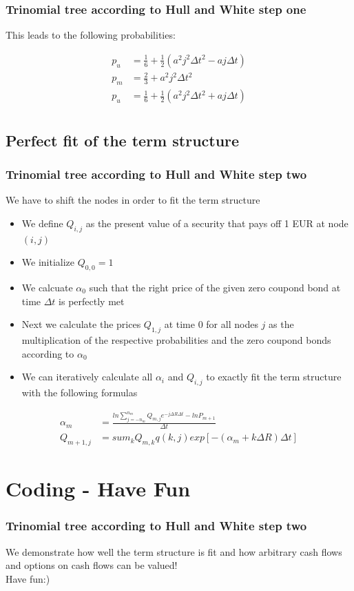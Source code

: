 \documentclass{beamer}
\begin{document}
\begin{frame}
\frametitle{Trinomial tree according to Hull and White step one} 

This leads to the following probabilities:

\begin{align*}
p_u &= \frac{1}{6} + \frac{1}{2}(a^2j^2 \Delta t^2 - a j \Delta t)\\
p_m &= \frac{2}{3} + a^2j^2 \Delta t^2 \\
p_u &= \frac{1}{6} + \frac{1}{2}(a^2j^2 \Delta t^2 + a j \Delta t)\\
\end{align*}

\end{frame}



\subsection{Perfect fit of the term structure}
\begin{frame}
\frametitle{Trinomial tree according to Hull and White step two} 
\vspace{0.4cm}
We have to shift the nodes in order to fit the term structure
\begin{itemize}
\item We define $Q_{i,j}$ as the present value of a security that pays off 1 EUR at node $(i,j)$
\item We initialize $Q_{0,0} = 1$
\item We calcuate $\alpha_0$ such that the right price of the given zero coupond bond at time $\Delta t$ is perfectly met
\item Next we calculate the prices $Q_{1,j}$ at time 0 for all nodes $j$ as the multiplication of the respective probabilities and the zero coupond bonds according to $\alpha_0$
\item We can iteratively calculate all $\alpha_i$ and $Q_{i,j}$ to exactly fit the term structure with the following formulas
\end{itemize}

\vspace{-0.6cm}

\begin{align*}
\alpha_m &= \frac{ln \sum_{j=-n_m}^{n_m} Q_{m,j} e^{-j\Delta R \Delta t} - ln P_{m+1}}{\Delta t}\\
Q_{m+1,j} &= sum_k Q_{m,k}q(k,j) exp[-(\alpha_m + k \Delta R) \Delta t]
\end{align*}

\end{frame}



\section{Coding - Have Fun}

\begin{frame}
\frametitle{Trinomial tree according to Hull and White step two} 
We demonstrate how well the term structure is fit and how arbitrary cash flows and options on cash flows can be valued!\\

Have fun:)
\end{frame}
\end{document}
